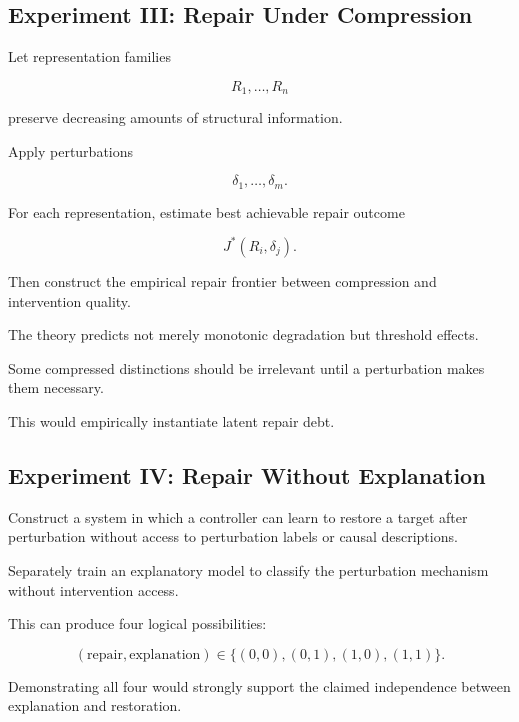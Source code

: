 \documentclass[11pt]{article}
\theoremstyle{remark}
\begin{document}
\subsection{Experiment III: Repair Under Compression}

Let representation families

\begin{equation}
R_1,\ldots,R_n
\end{equation}

preserve decreasing amounts of structural information.

Apply perturbations

\begin{equation}
\delta_1,\ldots,\delta_m.
\end{equation}

For each representation, estimate best achievable repair outcome

\begin{equation}
J^\ast(R_i,\delta_j).
\end{equation}

Then construct the empirical repair frontier between compression and intervention quality.

The theory predicts not merely monotonic degradation but threshold effects.

Some compressed distinctions should be irrelevant until a perturbation makes them necessary.

This would empirically instantiate latent repair debt.

\subsection{Experiment IV: Repair Without Explanation}

Construct a system in which a controller can learn to restore a target after perturbation without access to perturbation labels or causal descriptions.

Separately train an explanatory model to classify the perturbation mechanism without intervention access.

This can produce four logical possibilities:

\begin{equation}
(\text{repair},\text{explanation})
\in
\{
(0,0),(0,1),(1,0),(1,1)
\}.
\end{equation}

Demonstrating all four would strongly support the claimed independence between explanation and restoration.
\end{document}
